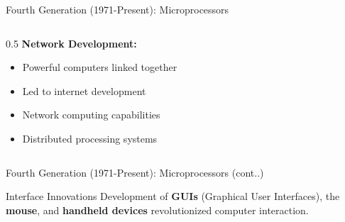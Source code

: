 \documentclass[aspectratio=169]{beamer}
\begin{document}
\begin{frame}{Fourth Generation (1971-Present): Microprocessors}
\begin{columns}
\begin{column}{0.5\textwidth}
            \textbf{Network Development:}
            \begin{itemize}
                \item Powerful computers linked together
                \item Led to internet development
                \item Network computing capabilities
                \item Distributed processing systems
            \end{itemize}
        \end{column}
    \end{columns}
 
\end{frame}



\begin{frame}{Fourth Generation (1971-Present): Microprocessors (cont..)}
    
    \begin{exampleblock}{Interface Innovations}
        Development of \textbf{GUIs} (Graphical User Interfaces), the \textbf{mouse}, and \textbf{handheld devices} revolutionized computer interaction.
    \end{exampleblock}
\end{frame}
\end{document}
